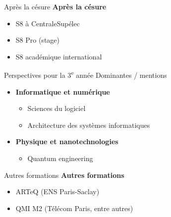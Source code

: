 \begin{frame}{Après la césure}
  \textbf{Après la césure}
  \begin{itemize}
    \item S8 à CentraleSupélec
    \item S8 Pro (stage)
    \item S8 académique international
  \end{itemize}
\end{frame}


\begin{frame}{Perspectives pour la 3\textsuperscript{e} année}
Dominantes / mentions
\vspace{.5em}
\begin{itemize}
  \item \textbf{Informatique et numérique}
  \begin{itemize}
      \item Sciences du logiciel
      \item Architecture des systèmes informatiques
  \end{itemize}
  \item \textbf{Physique et nanotechnologies}
  \begin{itemize}
      \item Quantum engineering
  \end{itemize}
\end{itemize}
\end{frame}

\begin{frame}{Autres formations}
  \textbf{Autres formations}
  \begin{itemize}
    \item ARTeQ (ENS Paris-Saclay)
    \item QMI M2 (Télécom Paris, entre autres)
  \end{itemize}
\end{frame}
